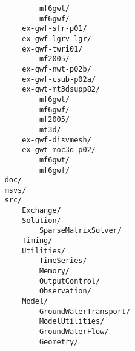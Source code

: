 \begin{verbatim}
            mf6gwt/ 
            mf6gwf/ 
        ex-gwf-sfr-p01/ 
        ex-gwf-lgrv-lgr/ 
        ex-gwf-twri01/ 
            mf2005/ 
        ex-gwf-nwt-p02b/ 
        ex-gwf-csub-p02a/ 
        ex-gwt-mt3dsupp82/ 
            mf6gwt/ 
            mf6gwf/ 
            mf2005/ 
            mt3d/ 
        ex-gwf-disvmesh/ 
        ex-gwt-moc3d-p02/ 
            mf6gwt/ 
            mf6gwf/ 
    doc/ 
    msvs/ 
    src/ 
        Exchange/ 
        Solution/ 
            SparseMatrixSolver/ 
        Timing/ 
        Utilities/ 
            TimeSeries/ 
            Memory/ 
            OutputControl/ 
            Observation/ 
        Model/ 
            GroundWaterTransport/ 
            ModelUtilities/ 
            GroundWaterFlow/ 
            Geometry/ 
\end{verbatim}
